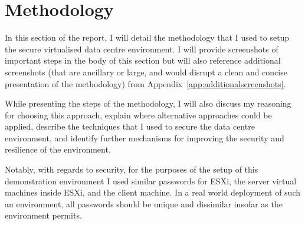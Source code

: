 \pagebreak
\section{Methodology}
In this section of the report, I will detail the methodology that I used to setup the secure virtualised data centre environment. I will provide screenshots of important steps in the body of this section but will also reference additional screenshots (that are ancillary or large, and would disrupt a clean and concise presentation of the methodology) from Appendix~\ref{app:additionalscreenshots}.

While presenting the steps of the methodology, I will also discuss my reasoning for choosing this approach, explain where alternative approaches could be applied, describe the techniques that I used to secure the data centre environment, and identify further mechanisms for improving the security and resilience of the environment.

Notably, with regards to security, for the purposes of the setup of this demonstration environment I used similar passwords for ESXi, the server virtual machines inside ESXi, and the client machine. In a real world deployment of such an environment, all passwords should be unique and dissimilar insofar as the environment permits.






